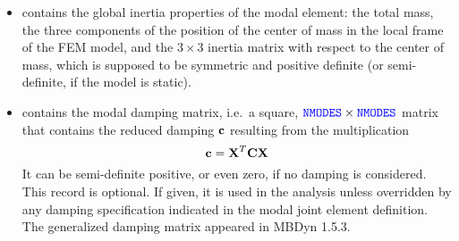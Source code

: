 \begin{itemize}
\item {} contains the global inertia properties
of the modal element: the total mass, the three components 
of the position of the center of mass in the local frame
of the FEM model, and the $3\times{3}$ inertia matrix
with respect to the center of mass, which is supposed
to be symmetric and positive definite (or semi-definite,
if the model is static).

\item {} contains the modal damping matrix,
i.e.\ a square, $\textcolor{blue}{\texttt{NMODES}} \times \textcolor{blue}{\texttt{NMODES}}$ matrix that contains
the reduced damping
$\bm{\mathbf c}$
resulting from the multiplication
\begin{equation}
	\bm{\mathbf c} = \bm{\mathbf X}^T \bm{\mathbf C} \bm{\mathbf X}
\end{equation}
It can be semi-definite positive, or even zero, if no damping is considered.
This record is optional.
If given, it is used in the analysis unless overridden by any damping
specification indicated in the modal joint element definition.
The generalized damping matrix appeared in MBDyn 1.5.3.


\end{itemize}
